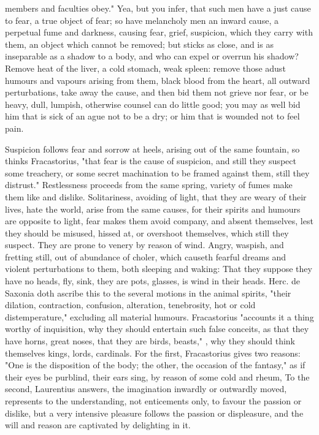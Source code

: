{members and faculties obey." Yea, but you infer, that such men have a just
cause to fear, a true object of fear; so have melancholy men an inward cause, a
perpetual fume and darkness, causing fear, grief, suspicion, which they carry
with them, an object which cannot be removed; but sticks as close, and is as
inseparable as a shadow to a body, and who can expel or overrun his shadow?
Remove heat of the liver, a cold stomach, weak spleen: remove those adust
humours and vapours arising from them, black blood from the heart, all outward
perturbations, take away the cause, and then bid them not grieve nor fear, or
be heavy, dull, lumpish, otherwise counsel can do little good; you may as well
bid him that is sick of an ague not to be a dry; or him that is wounded not to
feel pain.

Suspicion follows fear and sorrow at heels, arising out of the same fountain,
so thinks Fracastorius, "that fear is the cause of
suspicion, and still they suspect some treachery, or some secret machination to
be framed against them, still they distrust." Restlessness proceeds from the
same spring, variety of fumes make them like and dislike. Solitariness,
avoiding of light, that they are weary of their lives, hate the world, arise
from the same causes, for their spirits and humours are opposite to light, fear
makes them avoid company, and absent themselves, lest they should be misused,
hissed at, or overshoot themselves, which still they suspect. They are prone to
venery by reason of wind. Angry, waspish, and fretting still, out of abundance
of choler, which causeth fearful dreams and violent perturbations to them, both
sleeping and waking: That they suppose they have no heads, fly, sink, they are
pots, glasses, \etc{} is wind in their heads. Herc. de
Saxonia doth ascribe this to the several motions in the animal spirits, "their
dilation, contraction, confusion, alteration, tenebrosity, hot or cold
distemperature," excluding all material humours.
Fracastorius "accounts it a thing worthy of inquisition,
why they should entertain such false conceits, as that they have horns, great
noses, that they are birds, beasts," \etc{}, why they should think themselves
kings, lords, cardinals. For the first, Fracastorius gives
two reasons: "One is the disposition of the body; the other, the occasion of
the fantasy," as if their eyes be purblind, their ears sing, by reason of some
cold and rheum, \etc{} To the second, Laurentius answers, the imagination
inwardly or outwardly moved, represents to the understanding, not enticements
only, to favour the passion or dislike, but a very intensive pleasure follows
the passion or displeasure, and the will and reason are captivated by
delighting in it.

}
